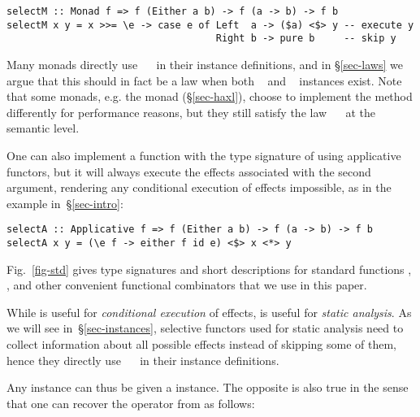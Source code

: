 \vspace{1mm}
\begin{verbatim}
selectM :: Monad f => f (Either a b) -> f (a -> b) -> f b
selectM x y = x >>= \e -> case e of Left  a -> ($a) <$> y -- execute y
                                    Right b -> pure b     -- skip y
\end{verbatim}
\vspace{1mm}

\noindent
Many monads directly use ~\hs{=}~ in their 
instance definitions, and in \S\ref{sec-laws} we argue that this should in fact
be a law when both ~ and ~ instances exist.
Note that some monads, e.g. the \Haxl monad (\S\ref{sec-haxl}), choose to
implement the   method differently for performance reasons, but they
still satisfy the law ~\hs{=}~ at the semantic level.

One can also implement a function with the type signature of  using
applicative functors, but it will always execute the effects associated with the
second argument, rendering any conditional execution of effects impossible, as
in the  example in~\S\ref{sec-intro}:

\vspace{1mm}
\begin{verbatim}
selectA :: Applicative f => f (Either a b) -> f (a -> b) -> f b
selectA x y = (\e f -> either f id e) <$> x <*> y
\end{verbatim}
\vspace{1mm}

\noindent
Fig.~\ref{fig-std} gives type signatures and short descriptions for standard
functions , , and other convenient functional combinators that
we use in this paper.

While  is useful for \emph{conditional execution} of effects,
 is useful for \emph{static analysis}. As we will see
in~\S\ref{sec-instances}, selective functors used for static analysis need to
collect information about all possible effects instead of skipping some of them,
hence they directly use ~\hs{=}~ in their 
instance definitions.

Any  instance can thus be given a  instance. The
opposite is also true in the sense that one can recover the operator \hs{<*>}
from  as follows:

